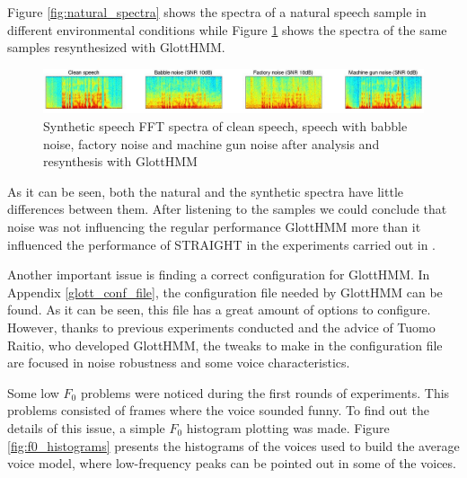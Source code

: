 Figure \ref{fig:natural_spectra} shows the spectra of a natural speech sample in different environmental conditions while Figure \ref{fig:synthetic_spectra} shows the spectra of the same samples resynthesized with GlottHMM.

\begin{figure}[!htb]
\begin{centering}
\includegraphics[width=\textwidth]{images/synthetic_spectra.jpg}
\caption{Synthetic speech FFT spectra of clean speech, speech with babble noise, factory noise and machine gun noise after analysis and resynthesis with GlottHMM}
\label{fig:synthetic_spectra}
\end{centering}
\end{figure}

As it can be seen, both the natural and the synthetic spectra have little differences between them.
%
%
After listening to the samples we could conclude that noise was not influencing the regular performance GlottHMM more than it influenced the performance of STRAIGHT in the experiments carried out in \cite{karhila_jstsp_14}.

Another important issue is finding a correct configuration for GlottHMM.
%
In Appendix \ref{glott_conf_file}, the configuration file needed by GlottHMM can be found.
%
As it can be seen, this file has a great amount of options to configure. 
%
However, thanks to previous experiments conducted and the advice of Tuomo Raitio, who developed GlottHMM, the tweaks to make in the configuration file are focused in noise robustness and some voice characteristics.

Some low $F_{0}$ problems were noticed during the first rounds of experiments.
% 
This problems consisted of frames where the voice sounded funny.
%
To find out the details of this issue, a simple $F_{0}$ histogram plotting was made.
%
Figure \ref{fig:f0_histograms} presents the histograms of the voices used to build the average voice model, where low-frequency peaks can be pointed out in some of the voices.


